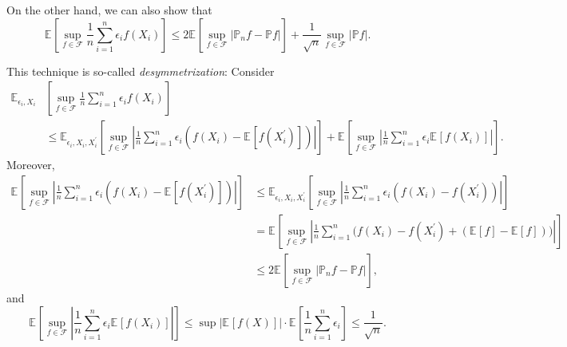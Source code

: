 \begin{remark}
	On the other hand, we can also show that
	\[
		\mathbb{E}_{}\left[\sup _{f\in \mathscr{F} } \frac{1}{n}\sum_{i=1}^{n} \epsilon _i f(X_i) \right]
		\leq 2 \mathbb{E}_{}\left[\sup _{f\in \mathscr{F} } \left\vert \mathbb{P} _n f - \mathbb{P} f \right\vert  \right] + \frac{1}{\sqrt{n} } \sup _{f\in \mathscr{F} } \vert \mathbb{P} f \vert.
	\]
\end{remark}
\begin{explanation}
	This technique is so-called \emph{desymmetrization}: Consider
	\[
		\begin{split}
			\mathbb{E}_{\epsilon _i, X_i}&\left[\sup _{f\in \mathscr{F} } \frac{1}{n}\sum_{i=1}^{n} \epsilon _i f(X_i) \right]\\
			&\leq \mathbb{E}_{\epsilon _i, X_i, X_i^{\prime} }\left[\sup _{f\in \mathscr{F} } \left\vert \frac{1}{n}\sum_{i=1}^{n} \epsilon _i (f(X_i) - \mathbb{E}_{}\left[f(X_i^{\prime} ) \right] ) \right\vert \right]
			+ \mathbb{E}_{}\left[\sup _{f\in \mathscr{F} } \left\vert \frac{1}{n}\sum_{i=1}^{n} \epsilon _i \mathbb{E}_{}\left[f(X_i) \right] \right\vert \right].
		\end{split}
	\]
	Moreover,
	\[
		\begin{split}
			\mathbb{E}_{}\left[\sup _{f\in \mathscr{F} } \left\vert \frac{1}{n}\sum_{i=1}^{n} \epsilon _i (f(X_i) - \mathbb{E}_{}\left[f(X_i^{\prime} ) \right] ) \right\vert \right]
			&\leq \mathbb{E}_{\epsilon _i, X_i, X_i^{\prime} }\left[ \sup _{f\in \mathscr{F} } \left\vert \frac{1}{n}\sum_{i=1}^{n} \epsilon _i (f(X_i) - f(X_i^{\prime} )) \right\vert  \right]\\
			&= \mathbb{E}_{}\left[\sup _{f\in \mathscr{F} } \left\vert \frac{1}{n}\sum_{i=1}^{n} \big( f(X_i) - f(X_i^{\prime} ) + (\mathbb{E}_{}\left[f \right] - \mathbb{E}_{}\left[f \right] ) \big) \right\vert  \right]\\
			&\leq 2 \mathbb{E}_{}\left[\sup _{f\in \mathscr{F} } \left\vert \mathbb{P} _n f - \mathbb{P} f \right\vert  \right] ,
		\end{split}
	\]
	and
	\[
		\mathbb{E}_{}\left[\sup _{f\in \mathscr{F} } \left\vert \frac{1}{n}\sum_{i=1}^{n} \epsilon _i \mathbb{E}_{}\left[f(X_i) \right] \right\vert \right]
		\leq \sup \left\vert \mathbb{E}_{}\left[f(X) \right]  \right\vert \cdot \mathbb{E}_{}\left[\frac{1}{n} \sum_{i=1}^{n} \epsilon _i \right]
		\leq \frac{1}{\sqrt{n} }.
	\]
\end{explanation}